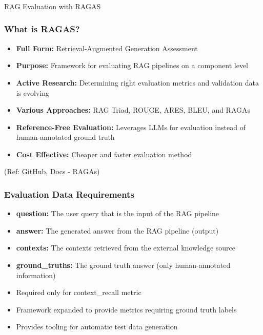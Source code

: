 \begin{frame}[fragile]\frametitle{}
\begin{center}
{\Large RAG Evaluation with RAGAS}
\end{center}
\end{frame}




\begin{frame}[fragile]\frametitle{What is RAGAS?}
  \begin{itemize}
    \item \textbf{Full Form:} Retrieval-Augmented Generation Assessment
    \item \textbf{Purpose:} Framework for evaluating RAG pipelines on a component level
    \item \textbf{Active Research:} Determining right evaluation metrics and validation data is evolving
    \item \textbf{Various Approaches:} RAG Triad, ROUGE, ARES, BLEU, and RAGAs
    \item \textbf{Reference-Free Evaluation:} Leverages LLMs for evaluation instead of human-annotated ground truth
    \item \textbf{Cost Effective:} Cheaper and faster evaluation method
  \end{itemize}
  
  {\tiny (Ref: GitHub, Docs - RAGAs)}
\end{frame}

\begin{frame}[fragile]\frametitle{Evaluation Data Requirements}
  \begin{itemize}
    \item \textbf{question:} The user query that is the input of the RAG pipeline
    \item \textbf{answer:} The generated answer from the RAG pipeline (output)
    \item \textbf{contexts:} The contexts retrieved from the external knowledge source
    \item \textbf{ground\_truths:} The ground truth answer (only human-annotated information)
    \item Required only for context\_recall metric
    \item Framework expanded to provide metrics requiring ground truth labels
    \item Provides tooling for automatic test data generation
  \end{itemize}
\end{frame}

